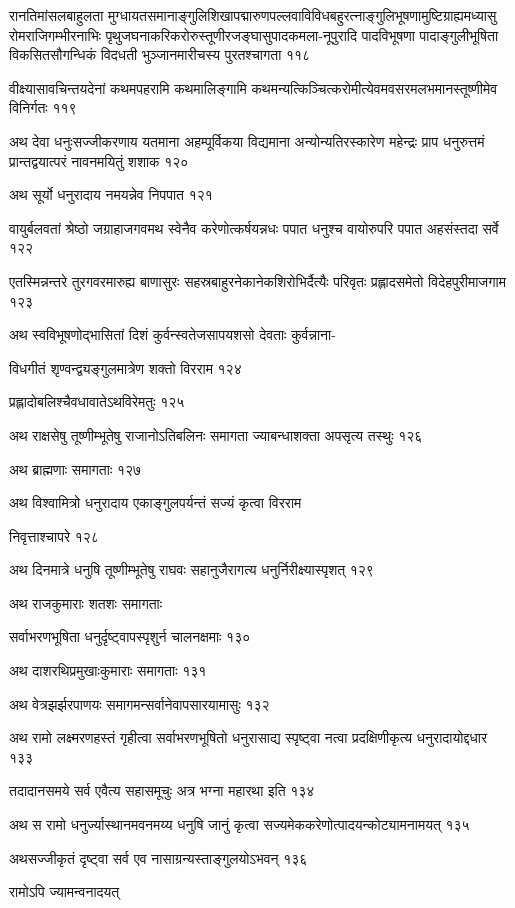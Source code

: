 रानतिमांसलबाहुलता
मुग्धायतसमानाङ्गुलिशिखापद्मारुणपल्लवाविविधबहुरत्नाङ्गुलिभूषणामुष्टिग्राह्यमध्यासु
रोमराजिगम्भीरनाभिः पृथुजघनाकरिकरोरुस्तूणीरजङ्घासुपादकमला-नूपुरादि पादविभूषणा
पादाङ्गुलीभूषिता विकसितसौगन्धिकं विदधती भुञ्जानमारीचस्य पुरतश्चागता ११८

वीक्ष्यासावचिन्तयदेनां कथमपहरामि कथमालिङ्गामि
कथमन्यत्किञ्चित्करोमीत्येवमवसरमलभमानस्तूष्णीमेव विनिर्गतः ११९

अथ देवा धनुःसज्जीकरणाय यतमाना अहम्पूर्विकया विद्यमाना अन्योन्यतिरस्कारेण महेन्द्रः प्राप
धनुरुत्तमं प्रान्तद्वयात्परं नावनमयितुं शशाक १२०

अथ सूर्यो धनुरादाय नमयन्नेव निपपात १२१

वायुर्बलवतां श्रेष्ठो जग्राहाजगवमथ स्वेनैव करेणोत्कर्षयन्नधः पपात धनुश्च वायोरुपरि पपात
अहसंस्तदा सर्वे १२२

एतस्मिन्नन्तरे तुरगवरमारुह्य बाणासुरः सहस्रबाहुरनेकानेकशिरोभिर्दैत्यैः परिवृतः प्रह्लादसमेतो
विदेहपुरीमाजगाम १२३

अथ स्वविभूषणोद्भासितां दिशं कुर्वन्स्वतेजसापयशसो देवताः कुर्वन्नाना-

विधगीतं शृण्वन्द्व्यङ्गुलमात्रेण शक्तो विरराम १२४

प्रह्लादोबलिश्चैवधावातेऽथविरेमतुः १२५

अथ राक्षसेषु तूष्णीम्भूतेषु राजानोऽतिबलिनः समागता ज्याबन्धाशक्ता अपसृत्य तस्थुः १२६

अथ ब्राह्मणाः समागताः १२७

अथ विश्वामित्रो धनुरादाय एकाङ्गुलपर्यन्तं सज्यं कृत्वा विरराम

निवृत्ताश्चापरे १२८

अथ दिनमात्रे धनुषि तूष्णीम्भूतेषु राघवः सहानुजैरागत्य धनुर्निरीक्ष्यास्पृशत् १२९

अथ राजकुमाराः शतशः समागताः

सर्वाभरणभूषिता धनुर्दृष्ट्वापस्पृशुर्न चालनक्षमाः १३०

अथ दाशरथिप्रमुखाःकुमाराः समागताः १३१

अथ वेत्रझर्झरपाणयः समागमन्सर्वानेवापसारयामासुः १३२

अथ रामो लक्ष्मरणहस्तं गृहीत्वा सर्वाभरणभूषितो धनुरासाद्य स्पृष्ट्वा नत्वा प्रदक्षिणीकृत्य
धनुरादायोद्दधार १३३

तदादानसमये सर्व एवैत्य सहासमूचुः अत्र भग्ना महारथा इति १३४

अथ स रामो धनुर्ज्यास्थानमवनमय्य धनुषि जानुं कृत्वा सज्यमेककरेणोत्पादयन्कोट्यामनामयत् १३५

अथसज्जीकृतं दृष्ट्वा सर्व एव नासाग्रन्यस्ताङ्गुलयोऽभवन् १३६

रामोऽपि ज्यामन्वनादयत्


